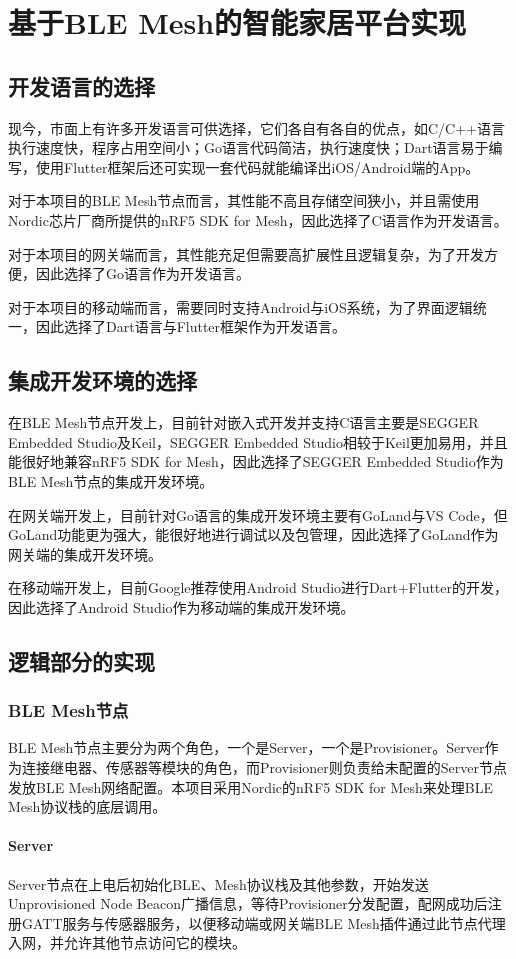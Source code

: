 \chapter{基于BLE Mesh的智能家居平台实现}
\section{开发语言的选择}
现今，市面上有许多开发语言可供选择，它们各自有各自的优点，如C/C++语言执行速度快，程序占用空间小；Go语言代码简洁，执行速度快；Dart语言易于编写，使用Flutter框架后还可实现一套代码就能编译出iOS/Android端的App。

对于本项目的BLE Mesh节点而言，其性能不高且存储空间狭小，并且需使用Nordic芯片厂商所提供的nRF5 SDK for Mesh，因此选择了C语言作为开发语言。

对于本项目的网关端而言，其性能充足但需要高扩展性且逻辑复杂，为了开发方便，因此选择了Go语言作为开发语言。

对于本项目的移动端而言，需要同时支持Android与iOS系统，为了界面逻辑统一，因此选择了Dart语言与Flutter框架作为开发语言。

\section{集成开发环境的选择}
在BLE Mesh节点开发上，目前针对嵌入式开发并支持C语言主要是SEGGER Embedded Studio及Keil，SEGGER Embedded Studio相较于Keil更加易用，并且能很好地兼容nRF5 SDK for Mesh，因此选择了SEGGER Embedded Studio作为BLE Mesh节点的集成开发环境。

在网关端开发上，目前针对Go语言的集成开发环境主要有GoLand与VS Code，但GoLand功能更为强大，能很好地进行调试以及包管理，因此选择了GoLand作为网关端的集成开发环境。

在移动端开发上，目前Google推荐使用Android Studio进行Dart+Flutter的开发，因此选择了Android Studio作为移动端的集成开发环境。

\section{逻辑部分的实现}
\subsection{BLE Mesh节点}
BLE Mesh节点主要分为两个角色，一个是Server，一个是Provisioner。Server作为连接继电器、传感器等模块的角色，而Provisioner则负责给未配置的Server节点发放BLE Mesh网络配置。本项目采用Nordic的nRF5 SDK for Mesh来处理BLE Mesh协议栈的底层调用。

\subsubsection{Server}
Server节点在上电后初始化BLE、Mesh协议栈及其他参数，开始发送Unprovisioned Node Beacon广播信息，等待Provisioner分发配置，配网成功后注册GATT服务与传感器服务，以便移动端或网关端BLE Mesh插件通过此节点代理入网，并允许其他节点访问它的模块。


